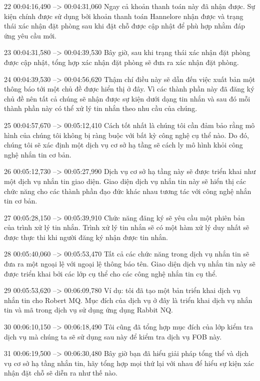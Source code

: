 22
00:04:16,490 --> 00:04:31,060
Ngay cả khoản thanh toán này đã nhận được.  Sự kiện chính được sử dụng bởi khoản thanh toán Hannelore nhận được và trạng thái xác nhận đặt phòng sau khi đặt chỗ được cập nhật để phù hợp nhằm đáp ứng yêu cầu mới.

23
00:04:31,580 --> 00:04:39,530
Bây giờ, sau khi trạng thái xác nhận đặt phòng được cập nhật, tổng hợp xác nhận đặt phòng sẽ đưa ra xác nhận đặt phòng.

24
00:04:39,530 --> 00:04:56,620
Thậm chí điều này sẽ dẫn đến việc xuất bản một thông báo tới một chủ đề được hiển thị ở đây.  Vì các thành phần này đã đăng ký chủ đề nên tất cả chúng sẽ nhận được sự kiện dưới dạng tin nhắn và sau đó mỗi thành phần này có thể xử lý tin nhắn theo nhu cầu của chúng.

25
00:04:57,670 --> 00:05:12,410
Cách tốt nhất là chúng tôi cần đảm bảo rằng mô hình của chúng tôi không bị ràng buộc với bất kỳ công nghệ cụ thể nào.  Do đó, chúng tôi sẽ xác định một dịch vụ cơ sở hạ tầng sẽ cách ly mô hình khỏi công nghệ nhắn tin cơ bản.

26
00:05:12,730 --> 00:05:27,990
Dịch vụ cơ sở hạ tầng này sẽ được triển khai như một dịch vụ nhắn tin giao diện.  Giao diện dịch vụ nhắn tin này sẽ hiển thị các chức năng cho các thành phần đạo đức khác nhau tương tác với công nghệ nhắn tin cơ bản.

27
00:05:28,150 --> 00:05:39,910
Chức năng đăng ký sẽ yêu cầu một phiên bản của trình xử lý tin nhắn.  Trình xử lý tin nhắn sẽ có một hàm xử lý duy nhất sẽ được thực thi khi người đăng ký nhận được tin nhắn.

28
00:05:40,060 --> 00:05:53,470
Tất cả các chức năng trong dịch vụ nhắn tin sẽ đưa ra một ngoại lệ với ngoại lệ thông báo tên.  Giao diện dịch vụ nhắn tin này sẽ được triển khai bởi các lớp cụ thể cho các công nghệ nhắn tin cụ thể.

29
00:05:53,620 --> 00:06:09,780
Ví dụ: tôi đã tạo một bản triển khai dịch vụ nhắn tin cho Robert MQ.  Mục đích của dịch vụ ở đây là triển khai dịch vụ nhắn tin và mã trong dịch vụ sử dụng ứng dụng Rabbit NQ.

30
00:06:10,150 --> 00:06:18,490
Tôi cũng đã tổng hợp mục đích của lớp kiểm tra dịch vụ mà chúng ta sẽ sử dụng sau này để kiểm tra dịch vụ FOB này.

31
00:06:19,500 --> 00:06:30,480
Bây giờ bạn đã hiểu giải pháp tổng thể và dịch vụ cơ sở hạ tầng nhắn tin, hãy tổng hợp mọi thứ lại với nhau để hiểu sự kiện xác nhận đặt chỗ sẽ diễn ra như thế nào.

